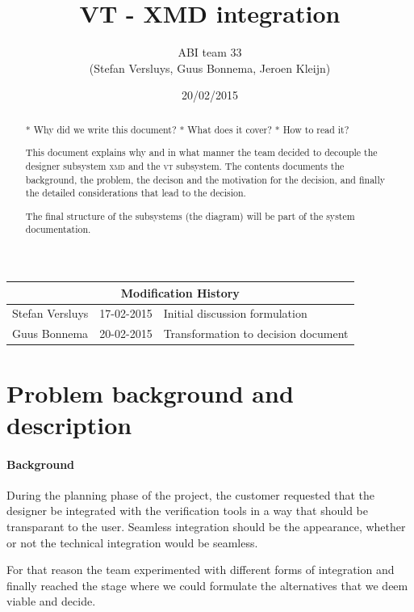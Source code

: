 \documentclass[a4paper,11pt,final]{article}
\author{ABI team 33\\(Stefan Versluys, Guus Bonnema, Jeroen Kleijn)}
\date{20/02/2015}
\title{\color{blue}VT - XMD integration}
\newcommand{\xmd}{\textsc{xmd}\xspace}%
\newcommand{\vt}{\textsc{vt}\xspace}%
\begin{document}

\maketitle

\begin{abstract}

	* Why did we write this document? 
	* What does it cover?
	* How to read it? 
	
	This document explains why and in what manner the team decided 
	to decouple the designer subsystem \xmd and the \vt subsystem.
	The contents documents the background, the problem, the decison
	and the motivation for the decision, and finally the detailed 
	considerations that lead to the decision.
	
	The final structure of the subsystems (the diagram) will be part of 
	the system documentation.
\end{abstract}


\begin{tabular}{|l|l|p{20em}|}
\hline 
\multicolumn{3}{|c|}{\bf Modification History}\\\hline
Stefan Versluys & 17-02-2015 & Initial discussion formulation \\\hline 
Guus Bonnema & 20-02-2015 & Transformation to decision document \\\hline 
\end{tabular} 


\tableofcontents

\section{Problem background and description}

\paragraph{Background}
During the planning phase of the project, the customer requested that
the designer be integrated with the verification tools in a way that
should be transparant to the user. Seamless integration should be the
appearance, whether or not the technical integration would be seamless.

For that reason the team experimented with different forms of integration
and finally reached the stage where we could formulate the alternatives
that we deem viable and decide.
\end{document}
